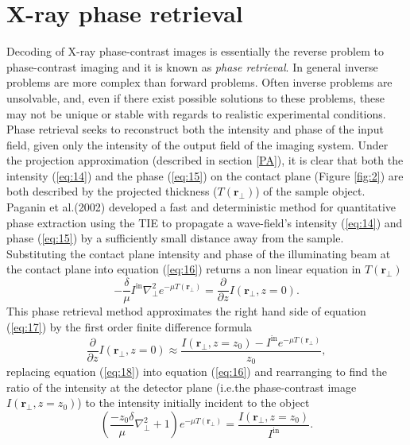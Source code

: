 \documentclass[10pt, a4paper, singlespacing]{report}
\begin{document}
\section{X-ray phase retrieval}\label{PR}
Decoding of X-ray phase-contrast images is essentially the reverse problem to phase-contrast imaging and it is known as \textit{phase retrieval}. 
In general inverse problems are more complex than forward problems. Often inverse problems are unsolvable, and, even if there exist possible solutions to these problems, these may not be unique or stable with regards to realistic experimental conditions. 
Phase retrieval seeks to reconstruct both the intensity and phase of the input field, given only the intensity of the output field of the imaging system\cite{PagsTutes}\cite{Pags2002}. Under the projection approximation (described in section \ref{PA}), it is clear that both the intensity (\ref{eq:14}) and the phase (\ref{eq:15}) on the contact plane (Figure \ref{fig:2}) are both described by the projected thickness ($T(\mathbf{r}_{\perp})$) of the sample object. Paganin et al.(2002) developed a fast and deterministic method for quantitative phase extraction\cite{Pags2002} using the TIE to propagate a wave-field's intensity (\ref{eq:14}) and phase (\ref{eq:15}) by a sufficiently small distance away from the sample.
Substituting the contact plane intensity and phase of the illuminating beam at the contact plane into equation (\ref{eq:16}) returns a non linear equation in $T(\mathbf{r}_{\perp})$
\begin{equation}\label{eq:17}
- \frac{\delta}{\mu} I^{\mathrm{in}} \nabla^{2}_{\perp} e^{-\mu T(\mathbf{r}_{\perp})} = \frac{\partial}{\partial z}I(\mathbf{r}_{\perp}, z=0).
\end{equation}
This phase retrieval method\cite{Pags2002} approximates the right hand side of equation (\ref{eq:17}) by the first order finite difference formula
\begin{equation}\label{eq:18}
\frac{\partial}{\partial z}I(\mathbf{r}_{\perp}, z=0) \approx \frac{I(\mathbf{r}_{\perp}, z=z_0) - I^{\mathrm{in}} e^{-\mu T(\mathbf{r}_{\perp})}}{z_0},
\end{equation}
replacing equation (\ref{eq:18}) into equation (\ref{eq:16}) and rearranging to find the ratio of the intensity at the detector plane (i.e.the phase-contrast image $I(\mathbf{r}_{\perp}, z = z_0)$) to the intensity initially incident to the object
 \begin{equation}\label{eq:19}
\left (\frac{- z_0 \delta}{\mu}\nabla^{2}_{\perp} + 1 \right )e^{-\mu T(\mathbf{r}_{\perp})} = \frac{I(\mathbf{r}_{\perp}, z=z_0)}{I^{\mathrm{in}}}.
\end{equation}
\end{document}
